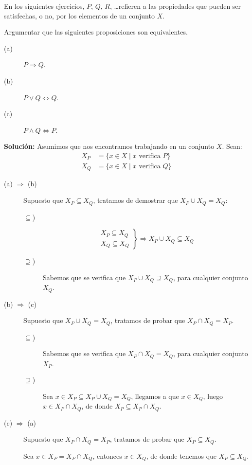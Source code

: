 \noindent
En los siguientes ejercicios, $P$, $Q$, $R$, \ldots refieren a las propiedades que pueden ser satisfechas, o no, por los elementos de un conjunto $X$.

\begin{ejercicio}
    Argumentar que las siguientes proposiciones son equivalentes.
    \begin{description}
        \item [(a)] $P \Longrightarrow Q$.
        \item [(b)] $P\lor Q \Longleftrightarrow Q$.
        \item [(c)] $P\land Q \Longleftrightarrow P$.
    \end{description}
    \textbf{Solución:} Asumimos que nos encontramos trabajando en un conjunto $X$. Sean:
    \begin{align*}
        X_P &= \{x\in X\mid x \text{\ verifica\ } P\} \\
        X_Q &= \{x\in X\mid x \text{\ verifica\ } Q\}
    \end{align*}
    \begin{description}
        \item [(a) $\Longrightarrow$ (b)] Supuesto que $X_P\subseteq X_Q$, tratamos de demostrar que $X_P\cup X_Q=X_Q$:
            \begin{description}
                \item [$\subseteq$)] 
                    \begin{equation*}
                        \left.\begin{array}{r}
                            X_P \subseteq X_Q \\
                            X_Q \subseteq X_Q
                        \end{array}\right\} \Longrightarrow X_P\cup X_Q \subseteq X_Q
                    \end{equation*}
                \item [$\supseteq$)] Sabemos que se verifica que $X_P\cup X_Q \supseteq X_Q$, para cualquier conjunto $X_Q$.
            \end{description}
        \item [(b) $\Longrightarrow$ (c)] Supuesto que $X_P\cup X_Q = X_Q$, tratamos de probar que $X_P\cap X_Q = X_P$.
            \begin{description}
                \item [$\subseteq$)] Sabemos que se verifica que $X_P\cap X_Q = X_Q$, para cualquier conjunto $X_P$.
                \item [$\supseteq$)] Sea $x\in X_P \subseteq X_P \cup X_Q = X_Q$, llegamos a que $x\in X_Q$, luego $x\in X_P\cap X_Q$, de donde $X_P\subseteq X_P\cap X_Q$.
            \end{description}
        \item [(c) $\Longrightarrow$ (a)] Supuesto que $X_P\cap X_Q = X_P$, tratamos de probar que $X_P\subseteq X_Q$.

            Sea $x\in X_P = X_P\cap X_Q$, entonces $x\in X_Q$, de donde tenemos que $X_P\subseteq X_Q$.
    \end{description}
\end{ejercicio}

